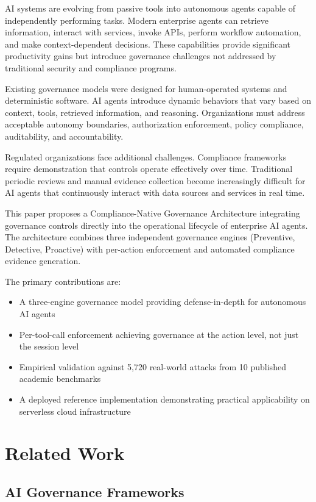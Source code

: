\documentclass[conference]{IEEEtran}
\begin{document}
AI systems are evolving from passive tools into autonomous agents capable of independently performing tasks. Modern enterprise agents can retrieve information, interact with services, invoke APIs, perform workflow automation, and make context-dependent decisions. These capabilities provide significant productivity gains but introduce governance challenges not addressed by traditional security and compliance programs.

Existing governance models were designed for human-operated systems and deterministic software. AI agents introduce dynamic behaviors that vary based on context, tools, retrieved information, and reasoning. Organizations must address acceptable autonomy boundaries, authorization enforcement, policy compliance, auditability, and accountability.

Regulated organizations face additional challenges. Compliance frameworks require demonstration that controls operate effectively over time. Traditional periodic reviews and manual evidence collection become increasingly difficult for AI agents that continuously interact with data sources and services in real time.

This paper proposes a Compliance-Native Governance Architecture integrating governance controls directly into the operational lifecycle of enterprise AI agents. The architecture combines three independent governance engines (Preventive, Detective, Proactive) with per-action enforcement and automated compliance evidence generation.

The primary contributions are:

\begin{itemize}
\item A three-engine governance model providing defense-in-depth for autonomous AI agents
\item Per-tool-call enforcement achieving governance at the action level, not just the session level
\item Empirical validation against 5,720 real-world attacks from 10 published academic benchmarks
\item A deployed reference implementation demonstrating practical applicability on serverless cloud infrastructure
\end{itemize}

\section{Related Work}

\subsection{AI Governance Frameworks}
\end{document}
